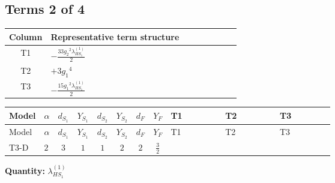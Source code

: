 \documentclass[8pt]{article}
\begin{document}
\begin{landscape}
\subsection*{Terms 2 of 4}
\begin{center}
\begin{tabular}{@{}c >{\raggedright\arraybackslash}p{0.82\linewidth}@{}}
\toprule
Column & Representative term structure \\
\midrule
T1 & \(\displaystyle -\frac{33 {g_2}^2 {\lambda_{HS_1}^{(1)}}}{2}\) \\
\midrule
T2 & \(\displaystyle +3 {g_1}^4\) \\
\midrule
T3 & \(\displaystyle -\frac{15 {g_1}^2 {\lambda_{HS_1}^{(1)}}}{2}\) \\
\midrule
\bottomrule
\end{tabular}
\end{center}
\smallskip
\tiny
\begin{longtable}{@{}llcccccc >{\raggedright\arraybackslash}p{0.21\linewidth} >{\raggedright\arraybackslash}p{0.21\linewidth} >{\raggedright\arraybackslash}p{0.21\linewidth}@{}}
\toprule
Model & $\alpha$ & $d_{S_1}$ & $Y_{S_1}$ & $d_{S_2}$ & $Y_{S_2}$ & $d_F$ & $Y_F$ & T1 & T2 & T3 \\
\midrule
\endfirsthead
\toprule
Model & $\alpha$ & $d_{S_1}$ & $Y_{S_1}$ & $d_{S_2}$ & $Y_{S_2}$ & $d_F$ & $Y_F$ & T1 & T2 & T3 \\
\midrule
\endhead
T3-D & $2$ & $3$ & $1$ & $1$ & $2$ & $2$ & $\frac{3}{2}$ & \scriptsize\adjustbox{max width=\linewidth}{$\begin{gathered} -\frac{33 {g_2}^2 {\lambda_{HS_1}^{(1)}}}{2}\end{gathered}$} & \scriptsize\adjustbox{max width=\linewidth}{$\begin{gathered} +3 {g_1}^4\end{gathered}$} & \scriptsize\adjustbox{max width=\linewidth}{$\begin{gathered} -\frac{15 {g_1}^2 {\lambda_{HS_1}^{(1)}}}{2}\end{gathered}$} \\
\midrule
\bottomrule
\end{longtable}
\clearpage
\noindent\textbf{Quantity: }$\lambda_{HS_1}^{(1)}$\par\smallskip

\end{landscape}
\end{document}
